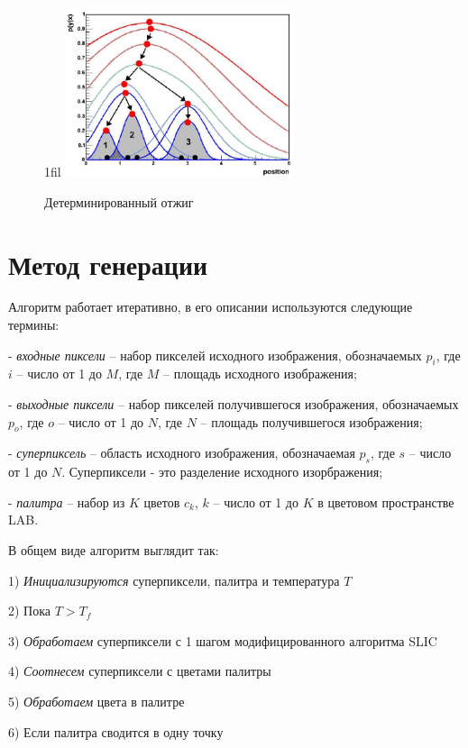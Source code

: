 \documentclass[a4paper,12pt]{report}
\makeatletter
\newcommand*{\centerfloat}{%
  \parindent \z@
  \leftskip \z@ \@plus 1fil \@minus \textwidth
  \rightskip\leftskip
  \parfillskip \z@skip}
\makeatother
\begin{document}
\begin{figure}
    \centerfloat
    \includegraphics[width=0.6\textwidth]{pixel/da.png}
    \caption{Детерминированный отжиг \citep{da}}
    \label{fig:da}
\end{figure}

\section{Метод генерации}

Алгоритм работает итеративно, в его описании используются следующие термины:

- \textit{входные пиксели} – набор пикселей исходного изображения, обозначаемых $p_i$, где $i$ – число от 1 до $M$, где $M$ – площадь исходного изображения; 

- \textit{выходные пиксели} – набор пикселей получившегося изображения, обозначаемых $p_o$, где $o$ – число от 1 до $N$, где $N$ – площадь получившегося изображения; 

- \textit{суперпиксель} – область исходного изображения, обозначаемая $p_s$, где $s$ – число от 1 до $N$. Суперпиксели - это разделение исходного изорбражения;

- \textit{палитра} – набор из $K$ цветов $c_k$, $k$ – число от 1 до $K$ в цветовом пространстве LAB.

В общем виде алгоритм выглядит так:

1)  \textit{Инициализируются} суперпиксели, палитра и температура $T$

2)  Пока $T > T_f$

3)      \textit{Обработаем} суперпиксели с 1 шагом модифицированного алгоритма SLIC

4)      \textit{Соотнесем} суперпиксели с цветами палитры

5)      \textit{Обработаем} цвета в палитре

6)      Если палитра сводится в одну точку
\end{document}
